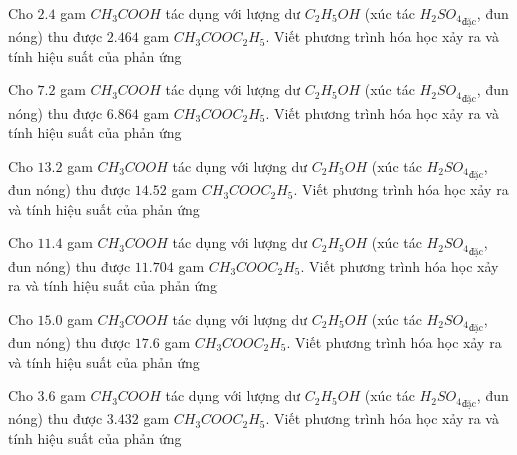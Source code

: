 \begin{bt}
Cho $2.4$ gam $CH_3COOH$ tác dụng với lượng dư $C_2H_5OH$ (xúc tác ${H_2SO_4}_{\text{đặc}}$, đun nóng) thu được $2.464$ gam $CH_3COOC_2H_5$. Viết phương trình hóa học xảy ra và tính hiệu suất của phản ứng
\end{bt}

\begin{bt}
Cho $7.2$ gam $CH_3COOH$ tác dụng với lượng dư $C_2H_5OH$ (xúc tác ${H_2SO_4}_{\text{đặc}}$, đun nóng) thu được $6.864$ gam $CH_3COOC_2H_5$. Viết phương trình hóa học xảy ra và tính hiệu suất của phản ứng
\end{bt}

\begin{bt}
Cho $13.2$ gam $CH_3COOH$ tác dụng với lượng dư $C_2H_5OH$ (xúc tác ${H_2SO_4}_{\text{đặc}}$, đun nóng) thu được $14.52$ gam $CH_3COOC_2H_5$. Viết phương trình hóa học xảy ra và tính hiệu suất của phản ứng
\end{bt}

\begin{bt}
Cho $11.4$ gam $CH_3COOH$ tác dụng với lượng dư $C_2H_5OH$ (xúc tác ${H_2SO_4}_{\text{đặc}}$, đun nóng) thu được $11.704$ gam $CH_3COOC_2H_5$. Viết phương trình hóa học xảy ra và tính hiệu suất của phản ứng
\end{bt}

\begin{bt}
Cho $15.0$ gam $CH_3COOH$ tác dụng với lượng dư $C_2H_5OH$ (xúc tác ${H_2SO_4}_{\text{đặc}}$, đun nóng) thu được $17.6$ gam $CH_3COOC_2H_5$. Viết phương trình hóa học xảy ra và tính hiệu suất của phản ứng
\end{bt}

\begin{bt}
Cho $3.6$ gam $CH_3COOH$ tác dụng với lượng dư $C_2H_5OH$ (xúc tác ${H_2SO_4}_{\text{đặc}}$, đun nóng) thu được $3.432$ gam $CH_3COOC_2H_5$. Viết phương trình hóa học xảy ra và tính hiệu suất của phản ứng
\end{bt}

